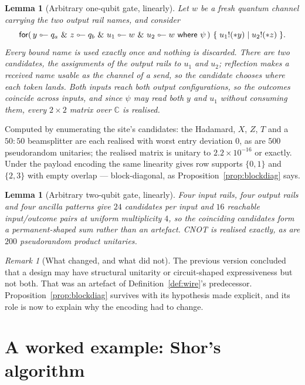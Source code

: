 \documentclass[11pt,a4paper]{article}
\theoremstyle{plain}
\newtheorem{lemma}[theorem]{Lemma}
\theoremstyle{definition}
\theoremstyle{remark}
\newtheorem{remark}[theorem]{Remark}
\newcommand{\Cx}{\mathbb{C}}
\newcommand{\lolli}{\mathrel{\reflectbox{$\multimap$}}}
\begin{document}
\begin{lemma}[Arbitrary one-qubit gate, linearly]\label{lem:1q}
Let $w$ be a fresh quantum channel carrying the two output rail names, and
consider
\[
  \textsf{for}(\, y \lolli q_a \ \&\ z \lolli q_b
   \ \&\ u_1 \lolli w \ \&\ u_2 \lolli w \ \textsf{where}\ \psi\,)
  \ \{\; u_1!(*y) \mid u_2!(*z) \;\}.
\]
Every bound name is used exactly once and nothing is discarded. There are two
candidates, the assignments of the output rails to $u_1$ and $u_2$; reflection
makes a received name usable as the channel of a send, so the candidate chooses
where each token lands. Both inputs reach both output configurations, so the
outcomes coincide across inputs, and since $\psi$ may read both $y$ and $u_1$
without consuming them, every $2\times2$ matrix over $\Cx$ is realised.
\end{lemma}

Computed by enumerating the site's candidates: the Hadamard, $X$, $Z$, $T$ and a
$50{:}50$ beamsplitter are each realised with worst entry deviation $0$, as are
$500$ pseudorandom unitaries; the realised matrix is unitary to $2.2\times
10^{-16}$ or exactly. Under the payload encoding the same linearity gives row
supports $\{0,1\}$ and $\{2,3\}$ with empty overlap --- block-diagonal, as
Proposition~\ref{prop:blockdiag} says.

\begin{lemma}[Arbitrary two-qubit gate, linearly]\label{lem:2q}
Four input rails, four output rails and four ancilla patterns give $24$
candidates per input and $16$ reachable input/outcome pairs at uniform
multiplicity $4$, so the coinciding candidates form a permanent-shaped sum
rather than an artefact. CNOT is realised exactly, as are $200$ pseudorandom
product unitaries.
\end{lemma}

\begin{remark}[What changed, and what did not]\label{rem:notprin}
The previous version concluded that a design may have structural unitarity or
circuit-shaped expressiveness but not both. That was an artefact of
Definition~\ref{def:wire}'s predecessor. Proposition~\ref{prop:blockdiag}
survives with its hypothesis made explicit, and its role is now to explain why
the encoding had to change.
\end{remark}

\section{A worked example: Shor's algorithm}\label{sec:shor}
\end{document}
